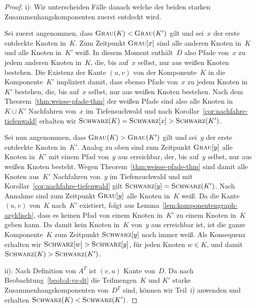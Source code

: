 \begin{proof}
i): Wir unterscheiden Fälle danach welche der beiden starken Zusammenhangskomponenten zuerst entdeckt wird.

Sei zuerst angenommen, dass $\mathop{\text{\textsc{Grau}}}(K) < \mathop{\text{\textsc{Grau}}}(K')$ gilt und sei~$x$ der erste entdeckte Knoten in~$K$.
Zum Zeitpunkt $\mathop{\text{\textsc{Grau}}}[x]$ sind alle anderen Knoten in~$K$ und alle Knoten in~$K'$ weiß.
In diesem Moment enthält~$D$ also Pfade von~$x$ zu jedem anderen Knoten in~$K$, die, bis auf~$x$ selbst, nur aus weißen Knoten bestehen.
Die Existenz der Kante $(u,v)$ von der Komponente~$K$ in die Komponente~$K'$ impliziert damit, dass ebenso Pfade von~$x$ zu jedem Knoten in~$K'$ bestehen, die, bis auf~$x$ selbst, nur aus weißen Knoten bestehen.
Nach dem Theorem~\ref{thm:weisse-pfade-thm} der weißen Pfade sind also alle Knoten in $K \cup K'$ Nachfahren von~$x$ im Tiefensuchwald und nach Korollar~\ref{cor:nachfahre-tiefenwald} erhalten wir $\mathop{\text{\textsc{Schwarz}}}(K) = \mathop{\text{\textsc{Schwarz}}}[x] > \mathop{\text{\textsc{Schwarz}}}(K')$.

Sei nun angenommen, dass $\mathop{\text{\textsc{Grau}}}(K) > \mathop{\text{\textsc{Grau}}}(K')$ gilt und sei~$y$ der erste entdeckte Knoten in~$K'$.
Analog zu oben sind zum Zeitpunkt $\mathop{\text{\textsc{Grau}}}[y]$ alle Knoten in~$K'$ mit einem Pfad von~$y$ aus erreichbar, der, bis auf~$y$ selbst, nur aus weißen Knoten besteht.
Wegen Theorem~\ref{thm:weisse-pfade-thm} sind damit alle Knoten aus~$K'$ Nachfahren von~$y$ im Tiefensuchwald und mit Korollar~\ref{cor:nachfahre-tiefenwald} gilt $\mathop{\text{\textsc{Schwarz}}}[y] = \mathop{\text{\textsc{Schwarz}}}(K')$.
Nach Annahme sind zum Zeitpunkt $\mathop{\text{\textsc{Grau}}}[y]$ alle Knoten in~$K$ weiß.
Da die Kante $(u,v)$ von~$K$ nach~$K'$ existiert, folgt aus Lemma~\ref{lem:komponentengraph-azyklisch}, dass es keinen Pfad von einem Knoten in~$K'$ zu einem Knoten in~$K$ geben kann.
Da damit kein Knoten in~$K$ von~$y$ aus erreichbar ist, ist die ganze Komponente~$K$ zum Zeitpunkt $\mathop{\text{\textsc{Schwarz}}}[y]$ noch immer weiß.
Als Konsequenz erhalten wir $\mathop{\text{\textsc{Schwarz}}}[w] > \mathop{\text{\textsc{Schwarz}}}[y]$, für jeden Knoten $w \in K$, und damit $\mathop{\text{\textsc{Schwarz}}}(K) > \mathop{\text{\textsc{Schwarz}}}(K')$.

ii): Nach Definition von $A^T$ ist $(v,u)$ Kante von~$D$.
Da nach Beobachtung~\ref{beob:d-vs-dt} die Teilmengen~$K$ und $K'$ starke Zusammenhangskomponenten von~$D^T$ sind, können wir Teil~i) anwenden und erhalten $\mathop{\text{\textsc{Schwarz}}}(K) < \mathop{\text{\textsc{Schwarz}}}(K')$.
\end{proof}

